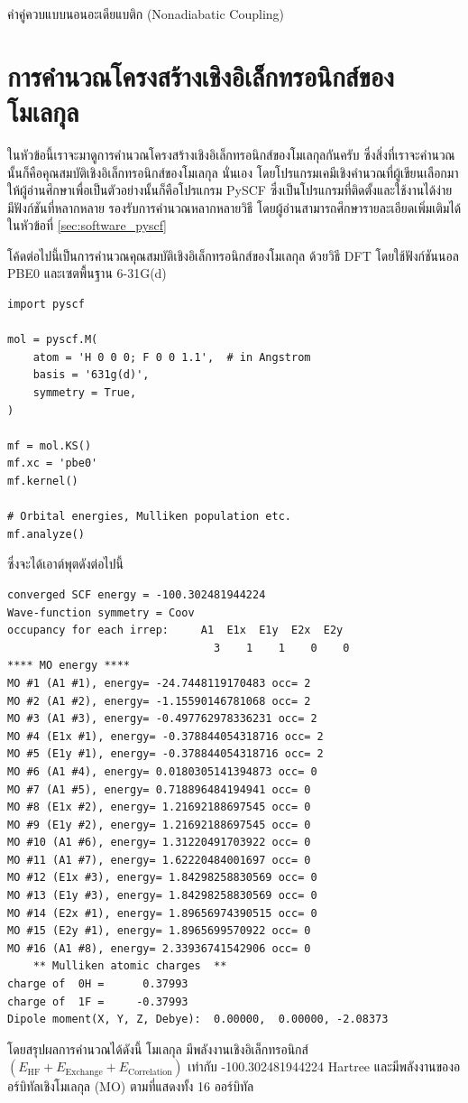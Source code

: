 ค่าคู่ควบแบบนอนอะเดียแบติก (Nonadiabatic Coupling)

\section{การคำนวณโครงสร้างเชิงอิเล็กทรอนิกส์ของโมเลกุล}
\label{sec:comp_elec_strct}

ในหัวข้อนี้เราจะมาดูการคำนวณโครงสร้างเชิงอิเล็กทรอนิกส์ของโมเลกุลกันครับ ซึ่งสิ่งที่เราจะคำนวณนั้นก็คือคุณสมบัติเชิงอิเล็กทรอนิกส์ของโมเลกุล%
นั่นเอง โดยโปรแกรมเคมีเชิงคำนวณที่ผู้เขียนเลือกมาให้ผู้อ่านศึกษาเพื่อเป็นตัวอย่างนั้นก็คือโปรแกรม PySCF ซึ่งเป็นโปรแกรมที่ติดตั้งและใช้งานได้ง่าย
มีฟังก์ชันที่หลากหลาย รองรับการคำนวณหลากหลายวิธี โดยผู้อ่านสามารถศึกษารายละเอียดเพิ่มเติมได้ในหัวข้อที่ \ref{sec:software_pyscf}

โค้ดต่อไปนี้เป็นการคำนวณคุณสมบัติเชิงอิเล็กทรอนิกส์ของโมเลกุล  ด้วยวิธี DFT โดยใช้ฟังก์ชันนอล PBE0 และเซตพื้นฐาน 6-31G(d)

\begin{lstlisting}[style=MyPython]
import pyscf

mol = pyscf.M(
    atom = 'H 0 0 0; F 0 0 1.1',  # in Angstrom
    basis = '631g(d)',
    symmetry = True,
)

mf = mol.KS()
mf.xc = 'pbe0'
mf.kernel()

# Orbital energies, Mulliken population etc.
mf.analyze()
\end{lstlisting}

\vspace{1em}
\noindent ซึ่งจะได้เอาต์พุตดังต่อไปนี้

\begin{lstlisting}[style=plain]
converged SCF energy = -100.302481944224
Wave-function symmetry = Coov
occupancy for each irrep:     A1  E1x  E1y  E2x  E2y
                                3    1    1    0    0
**** MO energy ****
MO #1 (A1 #1), energy= -24.7448119170483 occ= 2
MO #2 (A1 #2), energy= -1.15590146781068 occ= 2
MO #3 (A1 #3), energy= -0.497762978336231 occ= 2
MO #4 (E1x #1), energy= -0.378844054318716 occ= 2
MO #5 (E1y #1), energy= -0.378844054318716 occ= 2
MO #6 (A1 #4), energy= 0.0180305141394873 occ= 0
MO #7 (A1 #5), energy= 0.718896484194941 occ= 0
MO #8 (E1x #2), energy= 1.21692188697545 occ= 0
MO #9 (E1y #2), energy= 1.21692188697545 occ= 0
MO #10 (A1 #6), energy= 1.31220491703922 occ= 0
MO #11 (A1 #7), energy= 1.62220484001697 occ= 0
MO #12 (E1x #3), energy= 1.84298258830569 occ= 0
MO #13 (E1y #3), energy= 1.84298258830569 occ= 0
MO #14 (E2x #1), energy= 1.89656974390515 occ= 0
MO #15 (E2y #1), energy= 1.8965699570922 occ= 0
MO #16 (A1 #8), energy= 2.33936741542906 occ= 0
    ** Mulliken atomic charges  **
charge of  0H =      0.37993
charge of  1F =     -0.37993
Dipole moment(X, Y, Z, Debye):  0.00000,  0.00000, -2.08373
\end{lstlisting}

\vspace{1em}
โดยสรุปผลการคำนวณได้ดังนี้ โมเลกุล  มีพลังงานเชิงอิเล็กทรอนิกส์ $(E_{\text{HF}} + E_{\text{Exchange}} +
    E_{\text{Correlation}})$ เท่ากับ -100.302481944224 Hartree และมีพลังงานของออร์บิทัลเชิงโมเลกุล (MO) ตามที่แสดงทั้ง 16 ออร์บิทัล
